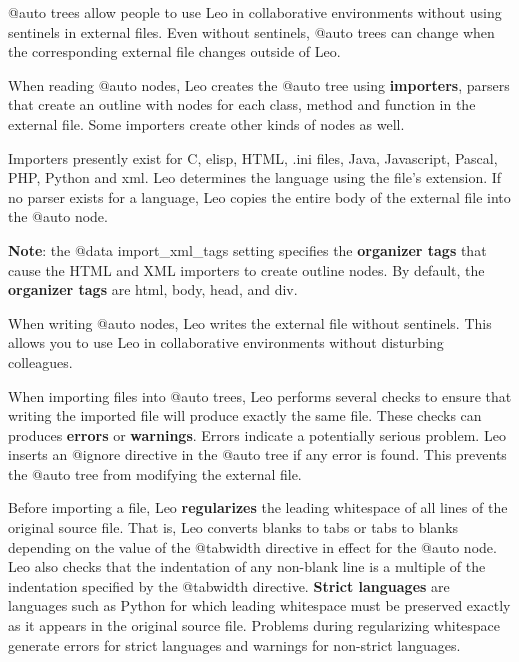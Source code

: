 \documentclass[a4paper,10pt,english]{sphinxmanual}
\begin{document}
@auto trees allow people to use Leo in collaborative environments without using
sentinels in external files. Even without sentinels, @auto trees can change
when the corresponding external file changes outside of Leo.

When reading @auto nodes, Leo creates the @auto tree using \textbf{importers},
parsers that create an outline with nodes for each class, method and function in
the external file. Some importers create other kinds of nodes as well.

Importers presently exist for C, elisp, HTML, .ini files, Java, Javascript, Pascal, PHP,
Python and xml. Leo determines the language using the file's extension. If no
parser exists for a language, Leo copies the entire body of the external file
into the @auto node.

\textbf{Note}: the @data import\_xml\_tags setting specifies the \textbf{organizer tags}
that cause the HTML and XML importers to create outline nodes. By default, the
\textbf{organizer tags} are html, body, head, and div.

When writing @auto nodes, Leo writes the external file without sentinels. This
allows you to use Leo in collaborative environments without disturbing colleagues.

When importing files into @auto trees, Leo performs several checks to ensure
that writing the imported file will produce exactly the same file. These checks
can produces \textbf{errors} or \textbf{warnings}. Errors indicate a potentially serious
problem. Leo inserts an @ignore directive in the @auto tree if any error is
found. This prevents the @auto tree from modifying the external file.

Before importing a file, Leo \textbf{regularizes} the leading whitespace of all
lines of the original source file. That is, Leo converts blanks to tabs or
tabs to blanks depending on the value of the @tabwidth directive in effect
for the @auto node. Leo also checks that the indentation of any non-blank
line is a multiple of the indentation specified by the @tabwidth directive.
\textbf{Strict languages} are languages such as Python for which leading
whitespace must be preserved exactly as it appears in the original source
file. Problems during regularizing whitespace generate errors for strict
languages and warnings for non-strict languages.
\end{document}
